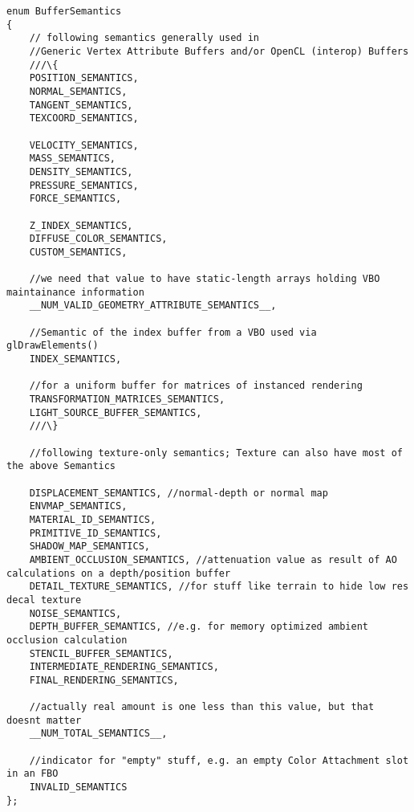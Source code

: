 
\begin{lstlisting}[caption={BufferSemantics},label=listing:BufferSemantics]	
enum BufferSemantics
{
	// following semantics generally used in
	//Generic Vertex Attribute Buffers and/or OpenCL (interop) Buffers
	///\{
	POSITION_SEMANTICS,
	NORMAL_SEMANTICS,
	TANGENT_SEMANTICS,
	TEXCOORD_SEMANTICS,

	VELOCITY_SEMANTICS,
	MASS_SEMANTICS,
	DENSITY_SEMANTICS,
	PRESSURE_SEMANTICS,
	FORCE_SEMANTICS,

	Z_INDEX_SEMANTICS,
	DIFFUSE_COLOR_SEMANTICS,
	CUSTOM_SEMANTICS,

	//we need that value to have static-length arrays holding VBO maintainance information
	__NUM_VALID_GEOMETRY_ATTRIBUTE_SEMANTICS__,

	//Semantic of the index buffer from a VBO used via glDrawElements()
	INDEX_SEMANTICS,

	//for a uniform buffer for matrices of instanced rendering
	TRANSFORMATION_MATRICES_SEMANTICS,
	LIGHT_SOURCE_BUFFER_SEMANTICS,
	///\}

	//following texture-only semantics; Texture can also have most of the above Semantics

	DISPLACEMENT_SEMANTICS, //normal-depth or normal map
	ENVMAP_SEMANTICS,
	MATERIAL_ID_SEMANTICS,
	PRIMITIVE_ID_SEMANTICS,
	SHADOW_MAP_SEMANTICS,
	AMBIENT_OCCLUSION_SEMANTICS, //attenuation value as result of AO calculations on a depth/position buffer
	DETAIL_TEXTURE_SEMANTICS, //for stuff like terrain to hide low res decal texture
	NOISE_SEMANTICS,
	DEPTH_BUFFER_SEMANTICS, //e.g. for memory optimized ambient occlusion calculation
	STENCIL_BUFFER_SEMANTICS,
	INTERMEDIATE_RENDERING_SEMANTICS,
	FINAL_RENDERING_SEMANTICS,

	//actually real amount is one less than this value, but that doesnt matter
	__NUM_TOTAL_SEMANTICS__,

	//indicator for "empty" stuff, e.g. an empty Color Attachment slot in an FBO
	INVALID_SEMANTICS
};
\end{lstlisting}



